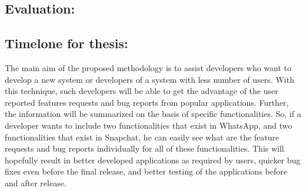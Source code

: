 \subsection{Evaluation:}

\subsection{Timelone for thesis:}

	The main aim of the proposed methodology is to assist developers who want to develop a new
system or developers of a system with less number of users. With this technique, such
developers will be able to get the advantage of the user reported features requests and bug reports
from popular applications. Further, the information will be summarized on the basis of specific
functionalities. So, if a developer wants to include two functionalities that exist in WhatsApp,
and two functionalities that exist in Snapchat, he can easily see what are the feature requests
and bug reports individually for all of these functionalities. This will hopefully result in better
developed applications as required by users, quicker bug fixes even before the final release, and
better testing of the applications before and after release.